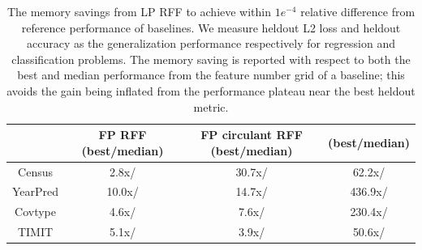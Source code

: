 
\begin{table}
	\centering
	\begin{tabular}{c c c c}
		\hline
		& FP RFF (best/median) & FP circulant RFF (best/median) & \Nystrom (best/median) \\
		\hline
		\hline
		Census & 2.8x/ & 30.7x/ & 62.2x/ \\
		YearPred & 10.0x/ & 14.7x/ & 436.9x/ \\ 
		Covtype & 4.6x/ & 7.6x/ & 230.4x/ \\ 
		TIMIT & 5.1x/ & 3.9x/ & 50.6x/ \\ 
		\hline
	\end{tabular}
	\caption{The memory savings from LP RFF to achieve within $1e^{-4}$ relative difference from reference performance of baselines. We measure heldout L2 loss and heldout accuracy as the generalization performance respectively for regression and classification problems. The memory saving is reported with respect to both the best and median performance from the feature number grid of a baseline; this avoids the gain being inflated from the performance plateau near the best heldout metric. }
	\label{fig:mem_saving}
\end{table}